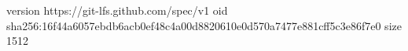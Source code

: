 version https://git-lfs.github.com/spec/v1
oid sha256:16f44a6057ebdb6acb0ef48c4a00d8820610e0d570a7477e881cff5c3e86f7e0
size 1512
